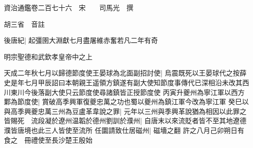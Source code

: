 






























































資治通鑑卷二百七十六　宋　　司馬光　撰

胡三省　音註

後唐紀|{
	起彊圉大淵獻七月盡屠維赤奮若凡二年有奇}


明宗聖德和武欽孝皇帝中之上

天成二年秋七月以歸德節度使王晏球為北面副招討使|{
	烏震既死以王晏球代之按薛史是年七月甲辰詔曰本朝親王遥領方鎮遂有副大使知節度事傳代已深相沿未改其西川東川今後落副大使只云節度使尋諸鎮皆正授節度使}
丙寅升夔州為寧江軍以西方鄴為節度使|{
	賞破高季興軍復夔忠萬之功也蜀以夔州為鎮江軍今改為寧江軍}
癸巳以與高季興夔忠萬三州為豆盧革韋說之罪|{
	元年以三州與季興革說猶為相因以此罪之}
皆賜死　流段凝於遼州温韜於德州劉訓於濮州|{
	自唐末以來流貶者皆不至其地遼德濮皆唐境也此三人皆使至流所}
任圜請致仕居磁州|{
	磁墻之翻}
許之八月己卯朔日有食之　冊禮使至長沙楚王殷始

